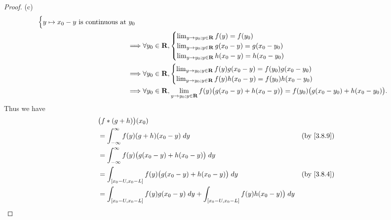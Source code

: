 \begin{proof}{(c)}
\begin{align*}
\begin{cases}
                                     y \mapsto x_0 - y \text{ is continuous at } y_0
                                   \end{cases}                                                                     \\
    \implies & \forall y_0 \in \mathbf{R}, \begin{cases}
                                     \lim_{y \to y_0 ; y \in \mathbf{R}} f(y) = f(y_0)             \\
                                     \lim_{y \to y_0 ; y \in \mathbf{R}} g(x_0 - y) = g(x_0 - y_0) \\
                                     \lim_{y \to y_0 ; y \in \mathbf{R}} h(x_0 - y) = h(x_0 - y_0)
                                   \end{cases}                                                              \\
    \implies & \forall y_0 \in \mathbf{R}, \begin{cases}
                                     \lim_{y \to y_0 ; y \in \mathbf{R}} f(y) g(x_0 - y) = f(y_0) g(x_0 - y_0) \\
                                     \lim_{y \to y_0 ; y \in \mathbf{R}} f(y) h(x_0 - y) = f(y_0) h(x_0 - y_0)
                                   \end{cases}                                                  \\
    \implies & \forall y_0 \in \mathbf{R}, \lim_{y \to y_0 ; y \in \mathbf{R}} f(y) \big(g(x_0 - y) + h(x_0 - y)\big) = f(y_0) \big(g(x_0 - y_0) + h(x_0 - y_0)\big).
  \end{align*}
  Thus we have
  \begin{align*}
     & \big(f * (g + h)\big)(x_0)                                                                                                          \\
     & = \int_{-\infty}^\infty f(y) (g + h)(x_0 - y) \; dy                                                      & \text{(by \cref{3.8.9})} \\
     & = \int_{-\infty}^\infty f(y) \big(g(x_0 - y) + h(x_0 - y)\big) \; dy                                                                \\
     & = \int_{[x_0 - U, x_0 - L]} f(y) \big(g(x_0 - y) + h(x_0 - y)\big) \; dy                                 & \text{(by \cref{3.8.4})} \\
     & = \int_{[x_0 - U, x_0 - L]} f(y) g(x_0 - y) \; dy + \int_{[x_0 - U, x_0 - L]} f(y) h(x_0 - y)\big) \; dy                            \\

\end{align*}
\end{proof}
